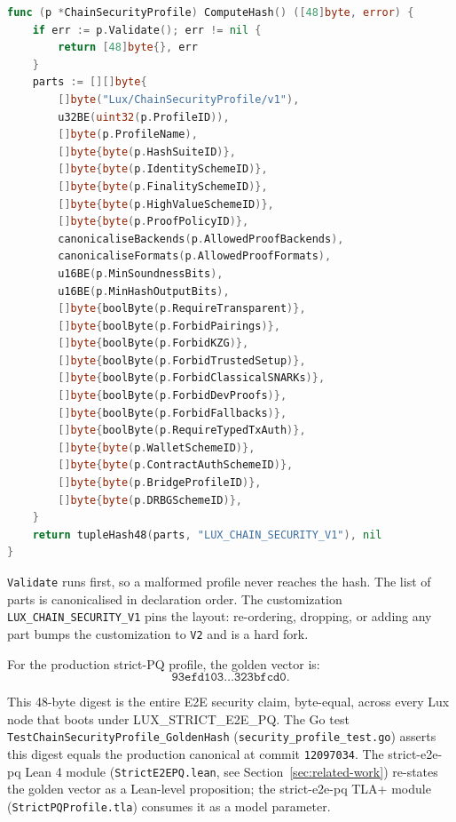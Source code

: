 \begin{lstlisting}[language=Go,caption={\texttt{ComputeHash} construction
sketch. Real code at \texttt{security\_profile.go:835} is byte-faithful;
shown here for the paper.}]
func (p *ChainSecurityProfile) ComputeHash() ([48]byte, error) {
    if err := p.Validate(); err != nil {
        return [48]byte{}, err
    }
    parts := [][]byte{
        []byte("Lux/ChainSecurityProfile/v1"),
        u32BE(uint32(p.ProfileID)),
        []byte(p.ProfileName),
        []byte{byte(p.HashSuiteID)},
        []byte{byte(p.IdentitySchemeID)},
        []byte{byte(p.FinalitySchemeID)},
        []byte{byte(p.HighValueSchemeID)},
        []byte{byte(p.ProofPolicyID)},
        canonicaliseBackends(p.AllowedProofBackends),
        canonicaliseFormats(p.AllowedProofFormats),
        u16BE(p.MinSoundnessBits),
        u16BE(p.MinHashOutputBits),
        []byte{boolByte(p.RequireTransparent)},
        []byte{boolByte(p.ForbidPairings)},
        []byte{boolByte(p.ForbidKZG)},
        []byte{boolByte(p.ForbidTrustedSetup)},
        []byte{boolByte(p.ForbidClassicalSNARKs)},
        []byte{boolByte(p.ForbidDevProofs)},
        []byte{boolByte(p.ForbidFallbacks)},
        []byte{boolByte(p.RequireTypedTxAuth)},
        []byte{byte(p.WalletSchemeID)},
        []byte{byte(p.ContractAuthSchemeID)},
        []byte{byte(p.BridgeProfileID)},
        []byte{byte(p.DRBGSchemeID)},
    }
    return tupleHash48(parts, "LUX_CHAIN_SECURITY_V1"), nil
}
\end{lstlisting}

\texttt{Validate} runs first, so a malformed profile never reaches the hash.
The list of parts is canonicalised in declaration order. The customization
\texttt{LUX\_CHAIN\_SECURITY\_V1} pins the layout: re-ordering, dropping, or
adding any part bumps the customization to \texttt{V2} and is a hard fork.

For the production strict-PQ profile, the golden vector is:
\[
\boxed{\texttt{93efd103\ldots323bfcd0}.}
\]

This 48-byte digest is the entire E2E security claim, byte-equal, across every
Lux node that boots under LUX\_STRICT\_E2E\_PQ. The Go test
\texttt{TestChainSecurityProfile\_GoldenHash} (\texttt{security\_profile\_test.go})
asserts this digest equals the production canonical at commit
\texttt{12097034}. The strict-e2e-pq Lean 4 module
(\texttt{StrictE2EPQ.lean}, see Section~\ref{sec:related-work}) re-states the
golden vector as a Lean-level proposition; the strict-e2e-pq TLA+ module
(\texttt{StrictPQProfile.tla}) consumes it as a model parameter.

